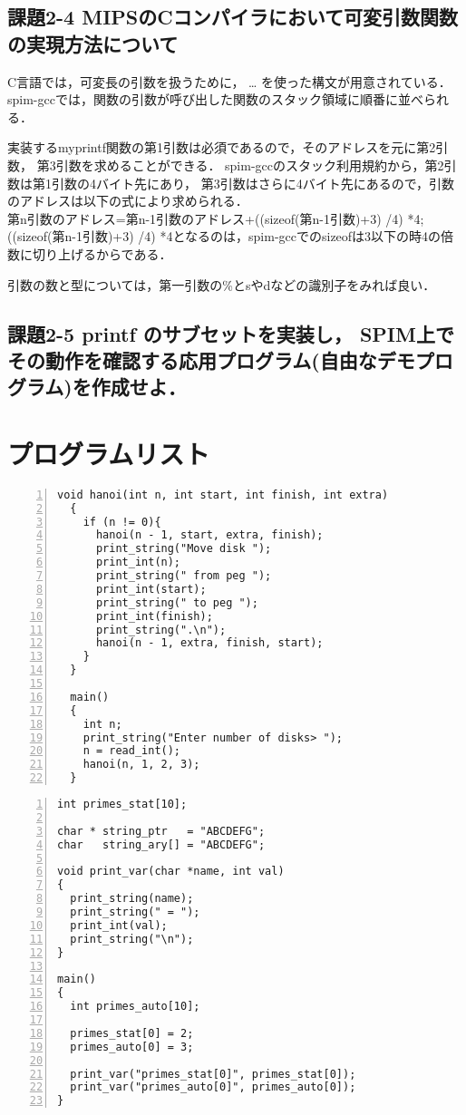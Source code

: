 \documentclass[11pt]{jarticle}
\begin{document}
\subsection{課題2-4 MIPSのCコンパイラにおいて可変引数関数の実現方法について}

C言語では，可変長の引数を扱うために， … を使った構文が用意されている．
spim-gccでは，関数の引数が呼び出した関数のスタック領域に順番に並べられる．

実装するmyprintf関数の第1引数は必須であるので，そのアドレスを元に第2引数，
第3引数を求めることができる．
spim-gccのスタック利用規約から，第2引数は第1引数の4バイト先にあり，
第3引数はさらに4バイト先にあるので，引数のアドレスは以下の式により求められる．
\\
第n引数のアドレス=第n-1引数のアドレス+((sizeof(第n-1引数)+3) /4) *4;
\\
((sizeof(第n-1引数)+3) /4) *4となるのは，spim-gccでのsizeofは3以下の時4の倍数に切り上げるからである．

引数の数と型については，第一引数の\%とsやdなどの識別子をみれば良い．

\subsection{課題2-5 printf のサブセットを実装し， SPIM上でその動作を確認する応用プログラム(自由なデモプログラム)を作成せよ．}

\section{プログラムリスト} \label{sec:program}

\begin{lstlisting}[caption=hanoi.c,label=hanoi,numbers=left]
  void hanoi(int n, int start, int finish, int extra)
  {
    if (n != 0){
      hanoi(n - 1, start, extra, finish);
      print_string("Move disk ");
      print_int(n);
      print_string(" from peg ");
      print_int(start);
      print_string(" to peg ");
      print_int(finish);
      print_string(".\n");
      hanoi(n - 1, extra, finish, start);
    }
  }
  
  main()
  {
    int n;
    print_string("Enter number of disks> ");
    n = read_int();
    hanoi(n, 1, 2, 3);
  }
\end{lstlisting}


\begin{lstlisting}[caption=report2-1.c,label=report2-1,numbers=left]
int primes_stat[10];

char * string_ptr   = "ABCDEFG";
char   string_ary[] = "ABCDEFG";

void print_var(char *name, int val)
{
  print_string(name);
  print_string(" = ");
  print_int(val);
  print_string("\n");
}

main()
{
  int primes_auto[10];

  primes_stat[0] = 2;
  primes_auto[0] = 3;

  print_var("primes_stat[0]", primes_stat[0]);
  print_var("primes_auto[0]", primes_auto[0]);
}
\end{lstlisting}
\end{document}
